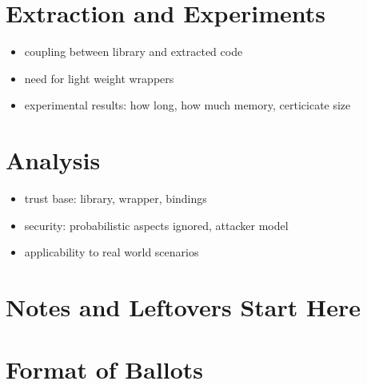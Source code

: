 \documentclass{llncs}
\begin{document}
\section{Extraction and Experiments}
\begin{itemize}
  \item coupling between library and extracted code
  \item need for light weight wrappers
  \item experimental results: how long, how much memory, certicicate
  size
\end{itemize}

\section{Analysis}
\begin{itemize}
  \item trust base: library, wrapper, bindings
  \item security: probabilistic aspects ignored, attacker model
  \item applicability to real world scenarios
\end{itemize}



\appendix
\section*{Notes and Leftovers Start Here}



\section{Format of Ballots}
\end{document}
